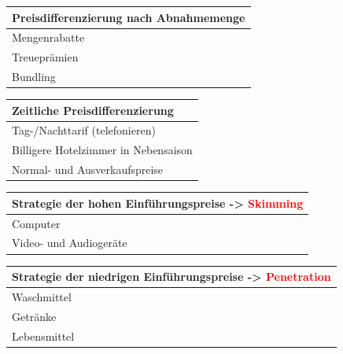 \documentclass[../ZF_Wing.tex]{subfiles}
\begin{document}
\begin{table} [H]

\begin{tabular}{l}

\colorbox{pink!30}{\textbf{Preisdifferenzierung nach Abnahmemenge} }

\\\hline
Mengenrabatte\\
Treueprämien\\
Bundling\\
\end{tabular}
\end{table}

\begin{table} [H]

\begin{tabular}{l}

\colorbox{pink!30}{\textbf{Zeitliche Preisdifferenzierung} }

\\\hline
Tag-/Nachttarif (telefonieren)\\
 Billigere Hotelzimmer in Nebensaison\\
 Normal- und Ausverkaufspreise\\
\end{tabular}
\end{table}




\begin{table} [H]

\begin{tabular}{l}

\colorbox{pink!30}{\textbf{Strategie der hohen Einführungspreise -> \textcolor {red}{Skimming}} }

\\\hline
Computer\\
Video- und Audiogeräte\\

\end{tabular}
\end{table}


\begin{table} [H]

\begin{tabular}{l}

\colorbox{pink!30}{\textbf{Strategie der niedrigen Einführungspreise -> \textcolor {red}{Penetration}}}

\\\hline
Waschmittel\\
Getränke\\
Lebensmittel\\

\end{tabular}
\end{table}
\end{document}
